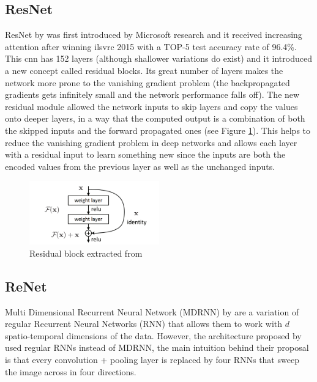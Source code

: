 \subsection{ResNet}
ResNet by \cite{DBLP:journals/corr/HeZRS15} was first introduced by Microsoft research and it received increasing attention after winning \gls{ilsvrc} 2015 with a TOP-5 test accuracy rate of 96.4\%. This \gls{cnn} has 152 layers (although shallower variations do exist) and it introduced a new concept called residual blocks. Its great number of layers makes the network more prone to the vanishing gradient problem (the backpropagated gradients gets infinitely small and the network performance falls off). The new residual module allowed the network inputs to skip layers and copy the values onto deeper layers, in a way that the computed output is a combination of both the skipped inputs and the forward propagated ones (see Figure \ref{fig:residual}). This helps to reduce the vanishing gradient problem in deep networks and allows each layer with a residual input to learn something new since the inputs are both the encoded values from the previous layer as well as the unchanged inputs.

\begin{figure}
	\includegraphics[width=0.5\textwidth]{archivos/residual.png}
	\centering
	\caption{Residual block extracted from \cite{DBLP:journals/corr/HeZRS15}}
	\label{fig:residual}
\end{figure}

\subsection{ReNet}
Multi Dimensional Recurrent Neural Network (MDRNN) by \cite{DBLP:journals/corr/abs-0705-2011} are a variation of regular Recurrent Neural Networks (RNN) that allows them to work with $d$ spatio-temporal dimensions of the data. However, the architecture proposed by \cite{DBLP:journals/corr/VisinKCMCB15} used regular RNNs instead of MDRNN, the main intuition behind their proposal is that every convolution + pooling layer is replaced by four RNNs that sweep the image across in four directions.

